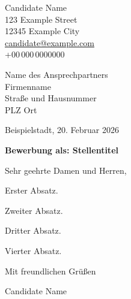 \documentclass[a4paper,11pt]{article}
\begin{document}
Candidate Name \\
123 Example Street \\
12345 Example City \\
\href{mailto:candidate@example.com}{candidate@example.com} \\
+00\,000\,0000000

\vspace{20pt}

Name des Ansprechpartners \\
Firmenname \\
Straße und Hausnummer \\
PLZ Ort

\vspace{20pt}

\begin{flushright}
   Beispielstadt, 20. Februar 2026
\end{flushright}

\vspace{10pt}

\textbf{Bewerbung als: Stellentitel}

\vspace{12pt}

Sehr geehrte Damen und Herren,


Erster Absatz.

Zweiter Absatz.

Dritter Absatz.

Vierter Absatz.

\vspace{20pt}

Mit freundlichen Grüßen

\vspace{40pt}

Candidate Name
\end{document}
